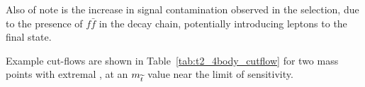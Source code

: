 Also of note is the increase in signal contamination observed in the \mj 
selection, due to the presence of $f\bar{f}$ in the decay chain, potentially 
introducing leptons to the final state.

Example cut-flows are shown in Table~\ref{tab:t2_4body_cutflow} for two mass
points with extremal \deltam, at an $m_{\widetilde{t}}$ value near the limit
of sensitivity.






